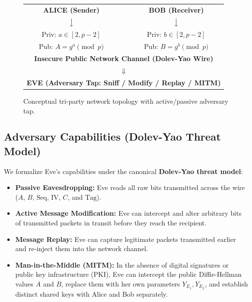 \documentclass[11pt,a4paper]{article}
\begin{document}
\begin{figure}[H]
    \centering
    \begin{tcolorbox}[colback=lightbg, colframe=bordercolor, width=0.92\linewidth, center]
    \centering\scriptsize\ttfamily
    \begin{tabular}{c c c}
    \textbf{ALICE (Sender)} & & \textbf{BOB (Receiver)} \\
    $\big\downarrow$ & & $\big\downarrow$ \\
    Priv: $a \in [2, p-2]$ & & Priv: $b \in [2, p-2]$ \\
    Pub: $A = g^a \pmod p$ & & Pub: $B = g^b \pmod p$ \\
    \midrule
    \multicolumn{3}{c}{\textbf{Insecure Public Network Channel (Dolev-Yao Wire)}} \\
    \multicolumn{3}{c}{$\Downarrow$} \\
    \multicolumn{3}{c}{\textbf{EVE (Adversary Tap: Sniff / Modify / Replay / MITM)}} \\
    \bottomrule
    \end{tabular}
    \end{tcolorbox}
    \caption{Conceptual tri-party network topology with active/passive adversary tap.}
    \label{fig:network_model}
\end{figure}

\subsection{Adversary Capabilities (Dolev-Yao Threat Model)}
We formalize Eve's capabilities under the canonical \textbf{Dolev-Yao threat model}:
\begin{itemize}[leftmargin=1cm]
    \item \textbf{Passive Eavesdropping:} Eve reads all raw bits transmitted across the wire ($A$, $B$, $\text{Seq}$, $\text{IV}$, $C$, and $\text{Tag}$).
    \item \textbf{Active Message Modification:} Eve can intercept and alter arbitrary bits of transmitted packets in transit before they reach the recipient.
    \item \textbf{Message Replay:} Eve can capture legitimate packets transmitted earlier and re-inject them into the network channel.
    \item \textbf{Man-in-the-Middle (MITM):} In the absence of digital signatures or public key infrastructure (PKI), Eve can intercept the public Diffie-Hellman values $A$ and $B$, replace them with her own parameters $Y_{E_1}, Y_{E_2}$, and establish distinct shared keys with Alice and Bob separately.
\end{itemize}
\end{document}
